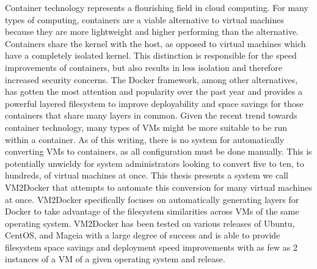 % 
% 
%
Container technology represents a flourishing field in cloud computing. For many types of computing, containers are a viable alternative to virtual machines because they are more lightweight and higher performing than the alternative. Containers share the kernel with the host, as opposed to virtual machines which have a completely isolated kernel. This distinction is responsible for the speed improvements of containers, but also results in less isolation and therefore increased security concerns. The Docker framework, among other alternatives, has gotten the most attention and popularity over the past year and provides a powerful layered filesystem to improve deployability and space savings for those containers that share many layers in common. Given the recent trend towards container technology, many types of VMs might be more suitable to be run within a container. As of this writing, there is no system for automatically converting VMs to containers, as all configuration must be done manually. This is potentially unwieldy for system administrators looking to convert five to ten, to hundreds, of virtual machines at once.  This thesis presents a system we call VM2Docker that attempts to automate this conversion for many virtual machines at once. VM2Docker specifically focuses on automatically generating layers for Docker to take advantage of the filesystem similarities across VMs of the same operating system. VM2Docker has been tested on various releases of Ubuntu, CentOS, and Mageia with a large degree of success and is able to provide filesystem space savings and deployment speed improvements with as few as 2 instances of a VM of a given operating system and release.
